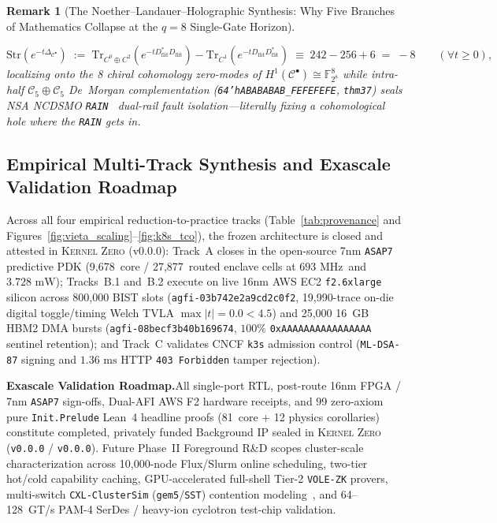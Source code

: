 \documentclass[11pt,letterpaper]{article}
\providecommand{\LeanTheoremTotal}{81}
\providecommand{\AwsAgfiId}{agfi-03b742e2a9cd2c0f2}
\providecommand{\AwsHbmAgfiId}{agfi-08becf3b40b169674}
\providecommand{\AwsLiveBursts}{25,000}
\providecommand{\AwsBistSlots}{800,000}
\providecommand{\AsicCoreCells}{9,678}
\providecommand{\AsicStandardCells}{27,877}
\providecommand{\AsicFmaxMhz}{\ensuremath{693\text{~MHz}}}
\providecommand{\AsicTotalPowerMw}{\ensuremath{3.728\text{~mW}}}
\theoremstyle{spectralthm}
\newtheorem{remark}[theorem]{Remark}
\begin{document}
\begin{remark}[The Noether--Landauer--Holographic Synthesis: Why Five Branches of Mathematics Collapse at the $q=8$ Single-Gate Horizon]
\begin{enumerate}[leftmargin=1.4em,label=\textup{(\roman*)},topsep=2.5pt,itemsep=2pt]
  \begin{equation}
  \label{eq:mckean_singer_cxl}
  \mathrm{Str}\!\left(e^{-t\Delta_{\mathcal{C}^\bullet}}\right) \;:=\; \mathrm{Tr}_{C^0\oplus C^2}\!\left(e^{-t D_{\mathrm{flit}}^* D_{\mathrm{flit}}}\right) - \mathrm{Tr}_{C^1}\!\left(e^{-t D_{\mathrm{flit}} D_{\mathrm{flit}}^*}\right) \;\equiv\; 242 - 256 + 6 \;=\; -8 \qquad (\forall t \ge 0),
  \end{equation}
  localizing onto the 8 chiral cohomology zero-modes of $H^1(\mathcal{C}^\bullet) \cong \mathbb{F}_{2^8}^8$ while intra-half $\mathcal{C}_5\oplus\mathcal{C}_5$ De~Morgan complementation (\texttt{64'hABABABAB\_FEFEFEFE}, \texttt{thm37}) seals NSA NCDSMO \texttt{RAIN}~\cite{ncdsmo2020rain} dual-rail fault isolation---literally \emph{fixing a cohomological hole where the \texttt{RAIN} gets in}.
\end{enumerate}
\end{remark}

\clearpage
\subsection{Empirical Multi-Track Synthesis and Exascale Validation Roadmap}
\label{sec:empirical_synthesis}
\label{sec:roadmap}
Across all four empirical reduction-to-practice tracks (Table~\ref{tab:provenance} and Figures~\ref{fig:vieta_scaling}--\ref{fig:k8s_tco}), the frozen architecture is closed and attested in \textsc{Kernel Zero} (v0.0.0): Track~A closes in the open-source 7nm \texttt{ASAP7} predictive PDK (\AsicCoreCells\ core / \AsicStandardCells\ routed enclave cells at \AsicFmaxMhz\ and \AsicTotalPowerMw); Tracks~B.1 and~B.2 execute on live 16nm AWS EC2 \texttt{f2.6xlarge} silicon across \AwsBistSlots{} BIST slots (\texttt{\AwsAgfiId}, 19,990-trace on-die digital toggle/timing Welch TVLA $\max|t|=0.0 < 4.5$) and \AwsLiveBursts{} 16~GB HBM2 DMA bursts (\texttt{\AwsHbmAgfiId}, $100\%$ \texttt{0xAAAAAAAAAAAAAAAA} sentinel retention); and Track~C validates CNCF \texttt{k3s} admission control (\texttt{ML-DSA-87} signing and $1.36\text{~ms}$ HTTP \texttt{403 Forbidden} tamper rejection).

\noindent\textbf{Exascale Validation Roadmap.}\;All single-port RTL, post-route 16nm FPGA / 7nm \texttt{ASAP7} sign-offs, Dual-AFI AWS F2 hardware receipts, and 99 zero-axiom pure \texttt{Init.Prelude} Lean~4 headline proofs (\LeanTheoremTotal\ core + 12 physics corollaries) constitute completed, privately funded Background IP sealed in \textsc{Kernel Zero} (\texttt{v0.0.0} / \texttt{v0.0.0}). Future Phase~II Foreground R\&D scopes cluster-scale characterization across 10,000-node Flux/Slurm online scheduling, two-tier hot/cold capability caching, GPU-accelerated full-shell Tier-2 \texttt{VOLE-ZK} provers, multi-switch \texttt{CXL-ClusterSim} (\texttt{gem5}/\texttt{SST}) contention modeling~\cite{goswami2026cxlclustersim}, and 64--128~GT/s PAM-4 SerDes / heavy-ion cyclotron test-chip validation.
\end{document}

